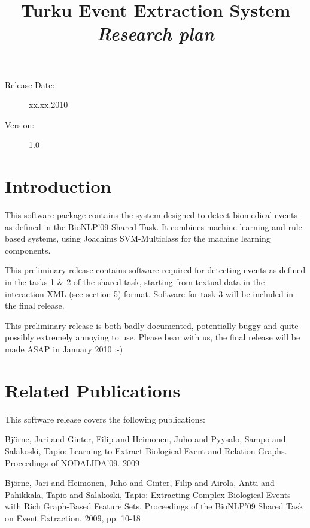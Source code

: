 \documentclass[a4paper,12pt]{article}
\title{\vspace{-4cm}Turku Event Extraction System\\\emph{Research plan}}
\author{}
\date{}
\begin{document}
\maketitle

\vspace{-2cm}\begin{description}
\item[Release Date:] xx.xx.2010
\item[Version:] 1.0
\end{description}

\tableofcontents


\section{Introduction}

This software package contains the system designed to detect biomedical events as defined in the BioNLP'09 Shared Task. It combines machine learning and rule based systems, using Joachims SVM-Multiclass for the machine learning components.

This preliminary release contains software required for detecting events as defined in the tasks 1 \& 2 of the shared task, starting from textual data in the interaction XML (see section 5) format. Software for task 3 will be included in the final release.

This preliminary release is both badly documented, potentially buggy and quite possibly extremely annoying to use. Please bear with us, the final release will be made ASAP in January 2010 :-)

\section{Related Publications}

This software release covers the following publications:

Björne, Jari and Ginter, Filip and Heimonen, Juho and Pyysalo, Sampo and Salakoski, Tapio: Learning to Extract Biological Event and Relation Graphs. Proceedings of NODALIDA'09. 2009

Björne, Jari and Heimonen, Juho and Ginter, Filip and Airola, Antti and Pahikkala, Tapio and Salakoski, Tapio: Extracting Complex Biological Events with Rich Graph-Based Feature Sets. Proceedings of the BioNLP'09 Shared Task on Event Extraction. 2009, pp. 10-18
\end{document}
